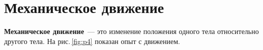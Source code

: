\documentclass[main.tex]{subfiles}
\begin{document}


\pagestyle{empty}

 

\setcounter{section}{3} 
\addtocounter{section}{-1} 

\section{Механическое движение}


\textbf{Механическое движение}~--- это изменение положения одного тела относительно другого тела. На рис.\,\ref{fig:p4} показан опыт с движением. 
\end{document}
